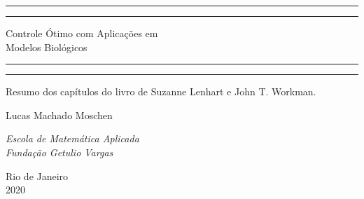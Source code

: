 \begin{titlepage} 
    
	\centering 
	
	
	\rule{\textwidth}{2pt}\vspace*{-\baselineskip}\vspace*{2pt} 
	\rule{\textwidth}{1pt} 
	
	\vspace{0.75\baselineskip}
	
	{\LARGE Controle Ótimo com Aplicações em \vspace{4mm} \\ Modelos Biológicos}
	
	\vspace{0.75\baselineskip} 
	
    \rule{\textwidth}{1pt}\vspace*{-\baselineskip}\vspace{3pt} 
	\rule{\textwidth}{2pt} 
	
	\vspace{2\baselineskip} 
	
	
    Resumo dos capítulos do livro de Suzanne Lenhart e John T. Workman.
	
	\vspace*{4\baselineskip}
    
	
	{\Large Lucas Machado Moschen\\} 
	
	\vspace{2\baselineskip}
	
    \textit{Escola de Matemática Aplicada\\} 
    \vspace{0.5\baselineskip}
    \textit{Fundação Getulio Vargas}
	
    \vfill
	
    \large Rio de Janeiro \\
    \vspace{0.5\baselineskip}
    \large 2020
    
\end{titlepage}